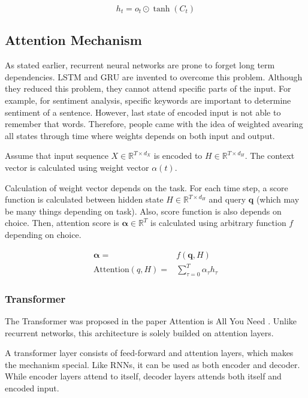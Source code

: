 \begin{equation}
h_t = o_t \odot \tanh(C_t)
\end{equation}

\subsection{Attention Mechanism}
As stated earlier, recurrent neural networks are prone to forget long term dependencies. LSTM and GRU are invented to overcome this problem. Although they reduced this problem, they cannot attend specific parts of the input. For example, for sentiment analysis, specific keywords are important to determine sentiment of a sentence. However, last state of encoded input is not able to remember that words. Therefore, people came with the idea of weighted avearing all states through time where weights depends on both input and output. 

Assume that input sequence $X \in \mathbb{R}^{T \times d_X}$ is encoded to $H \in \mathbb{R}^{T \times d_H}$. The context vector is calculated using weight vector $\alpha(t)$. 

Calculation of weight vector depends on the task. For each time step, a score function is calculated between hidden state $H \in \mathbb{R}^{T \times d_H}$ and query $\boldsymbol{q}$ (which may be many things depending on task). Also, score function is also depends on choice. Then, attention score is $\boldsymbol{\alpha} \in \mathbb{R}^{T}$ is calculated using arbitrary function $f$ depending on choice.

\begin{equation}
\begin{split}
\boldsymbol{\alpha} = & f(\boldsymbol{q}, H) \\
\mathrm{Attention}(q, H) = & \sum_{\tau=0}^{T} \alpha_{\tau} h_{\tau}
\end{split}
\end{equation}


\subsubsection{Transformer}
The Transformer was proposed in the paper Attention is All You Need \cite{vaswani_attention_2017} . Unlike recurrent networks, this architecture is solely builded on attention layers. 

A transformer layer consists of feed-forward and attention layers, which makes the mechanism special. Like RNNs, it can be used as both encoder and decoder. While encoder layers attend to itself, decoder layers attends both itself and encoded input.

